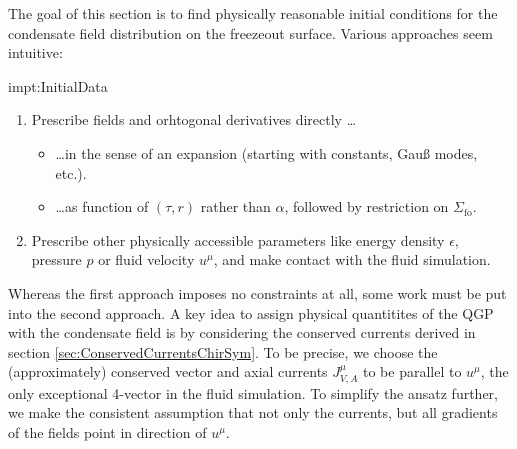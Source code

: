 The goal of this section is to find physically reasonable initial conditions for the condensate field distribution on the freezeout surface. Various approaches seem intuitive:
\begin{impt}{impt:InitialData}
\begin{enumerate}
    \item Prescribe fields and orhtogonal derivatives directly \dots
    \begin{itemize}
        \item \dots in the sense of an expansion (starting with constants, Gauß modes, etc.).
        \item \dots as function of $(\tau,r)$ rather than $\alpha$, followed by restriction on $\Sigma_{\text{fo}}$.
    \end{itemize}
    \item Prescribe other physically accessible parameters like energy density $\epsilon$, pressure $p$ or fluid velocity $u^\mu$, and make contact with the fluid simulation.
\end{enumerate}
\end{impt}
Whereas the first approach imposes no constraints at all, some work must be put into the second approach. A key idea to assign physical quantitites of the QGP with the condensate field is by considering the conserved currents derived in section \ref{sec:ConservedCurrentsChirSym}. To be precise, we choose the (approximately) conserved vector and axial currents $J^\mu_{V,A}$ to be parallel to $u^\mu$, the only exceptional 4-vector in the fluid simulation. To simplify the ansatz further, we make the consistent assumption that not only the currents, but all gradients of the fields point in direction of $u^\mu$.

